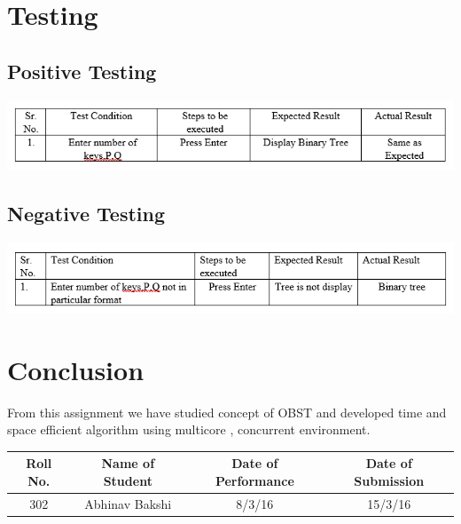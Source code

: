\documentclass[a4paper,12pt]{article}
\begin{document}
\section{Testing}
\subsection{Positive Testing}
\includegraphics[width=\textwidth]{obst_positive}

\subsection{Negative Testing}
\includegraphics[width=\textwidth]{obst_negative}

\vspace{50px}


\section{Conclusion}
From this assignment we have studied concept of OBST and developed time and space efficient algorithm using multicore , concurrent environment.  
\vspace{20px}
\begin{center}
	\begin{tabular}
		{|c|c|c|c|}\hline
		{\bf Roll No.}		&{\bf Name of Student}		&{\bf Date of Performance}  				&{\bf Date of Submission}  \\ \hline
		{302}	&	{Abhinav Bakshi}& {8/3/16}	&  {15/3/16}\\ \hline
	\end{tabular}\\ 
\end{center}
\end{document}
